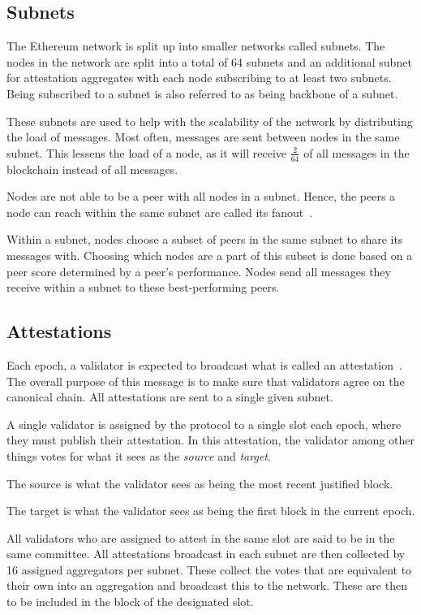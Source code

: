 \subsection{Subnets}\label{subsec:subnets}
The Ethereum network is split up into smaller networks called subnets.
The nodes in the network are split into a total of 64 subnets and an additional subnet for attestation aggregates with each node subscribing to at least two subnets.
Being subscribed to a subnet is also referred to as being backbone of a subnet.

These subnets are used to help with the scalability of the network by distributing the load of messages.
Most often, messages are sent between nodes in the same subnet.
This lessens the load of a node, as it will receive $\frac{2}{64}$ of all messages in the blockchain instead of all messages.


Nodes are not able to be a peer with all nodes in a subnet.
Hence, the peers a node can reach within the same subnet are called its fanout~\cite{heimbach2024deanonymizingethereumvalidatorsp2p}.

Within a subnet, nodes choose a subset of peers in the same subnet to share its messages with.
Choosing which nodes are a part of this subset is done based on a peer score determined by a peer's performance.
Nodes send all messages they receive within a subnet to these best-performing peers.

\subsection{Attestations}\label{subsec:attestations}
Each epoch, a validator is expected to broadcast what is called an attestation~\cite{attestations}.
The overall purpose of this message is to make sure that validators agree on the canonical chain.
All attestations are sent to a single given subnet.

A single validator is assigned by the protocol to a single slot each epoch, where they must publish their attestation.
In this attestation, the validator among other things votes for what it sees as the \textit{source} and \textit{target}.

The source is what the validator sees as being the most recent justified block.

The target is what the validator sees as being the first block in the current epoch.

All validators who are assigned to attest in the same slot are said to be in the same committee.
All attestations broadcast in each subnet are then collected by 16 assigned aggregators per subnet.
These collect the votes that are equivalent to their own into an aggregation and broadcast this to the network.
These are then to be included in the block of the designated slot.


